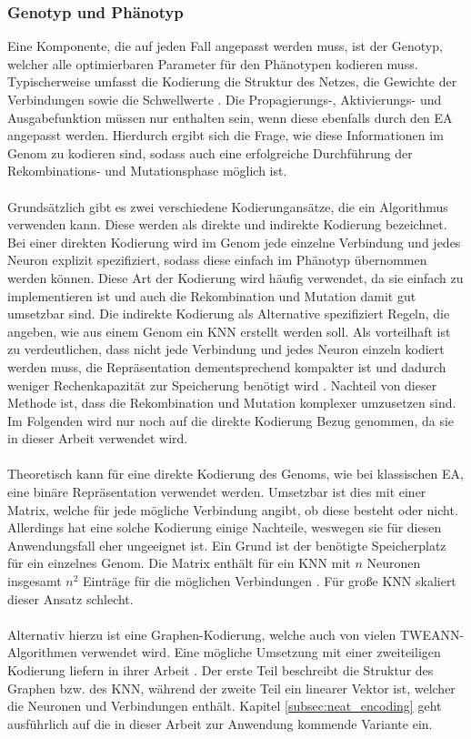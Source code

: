 \subsubsection{Genotyp und Phänotyp}
Eine Komponente, die auf jeden Fall angepasst werden muss, ist der Genotyp, welcher alle optimierbaren Parameter für den Phänotypen kodieren muss. Typischerweise umfasst die Kodierung die Struktur des Netzes, die Gewichte der Verbindungen sowie die Schwellwerte \cite{stanley2002evolving}. Die Propagierungs-, Aktivierungs- und Ausgabefunktion müssen nur enthalten sein, wenn diese ebenfalls durch den \ac{EA} angepasst werden. Hierdurch ergibt sich die Frage, wie diese Informationen im Genom zu kodieren sind, sodass auch eine erfolgreiche Durchführung der Rekombinations- und Mutationsphase möglich ist. 
\\\\
Grundsätzlich gibt es zwei verschiedene Kodierungansätze, die ein Algorithmus verwenden kann. Diese werden als direkte und indirekte Kodierung bezeichnet. Bei einer direkten Kodierung wird im Genom jede einzelne Verbindung und jedes Neuron explizit spezifiziert, sodass diese einfach im Phänotyp übernommen werden können. Diese Art der Kodierung wird häufig verwendet, da sie einfach zu implementieren ist und auch die Rekombination und Mutation damit gut umsetzbar sind. Die indirekte Kodierung als Alternative spezifiziert Regeln, die angeben, wie aus einem Genom ein \ac{KNN} erstellt werden soll. Als vorteilhaft ist zu verdeutlichen, dass nicht jede Verbindung und jedes Neuron einzeln kodiert werden muss, die Repräsentation dementsprechend kompakter ist und dadurch weniger Rechenkapazität zur Speicherung benötigt wird \cite{stanley2002evolving}. Nachteil von dieser Methode ist, dass die Rekombination und Mutation komplexer umzusetzen sind. Im Folgenden wird nur noch auf die direkte Kodierung Bezug genommen, da sie in dieser Arbeit verwendet wird.
\\\\
Theoretisch kann für eine direkte Kodierung des Genoms, wie bei klassischen \ac{EA}, eine binäre Repräsentation verwendet werden. Umsetzbar ist dies mit einer Matrix, welche für jede mögliche Verbindung angibt, ob diese besteht oder nicht. Allerdings hat eine solche Kodierung einige Nachteile, weswegen sie für diesen Anwendungsfall eher ungeeignet ist. Ein Grund ist der benötigte Speicherplatz für ein einzelnes Genom. Die Matrix enthält für ein \ac{KNN} mit $n$ Neuronen insgesamt $n^2$ Einträge für die möglichen Verbindungen \cite{stanley2002evolving}. Für große \ac{KNN} skaliert dieser Ansatz schlecht.
\\\\
Alternativ hierzu ist eine Graphen-Kodierung, welche auch von vielen \ac{TWEANN}-Algorithmen verwendet wird. Eine mögliche Umsetzung mit einer zweiteiligen Kodierung liefern \citeauthor{pujol1998evolving} in ihrer Arbeit \cite{pujol1998evolving}. Der erste Teil beschreibt die Struktur des Graphen bzw. des \ac{KNN}, während der zweite Teil ein linearer Vektor ist, welcher die Neuronen und Verbindungen enthält. Kapitel \ref{subsec:neat_encoding} geht ausführlich auf die in dieser Arbeit zur Anwendung kommende Variante ein.

